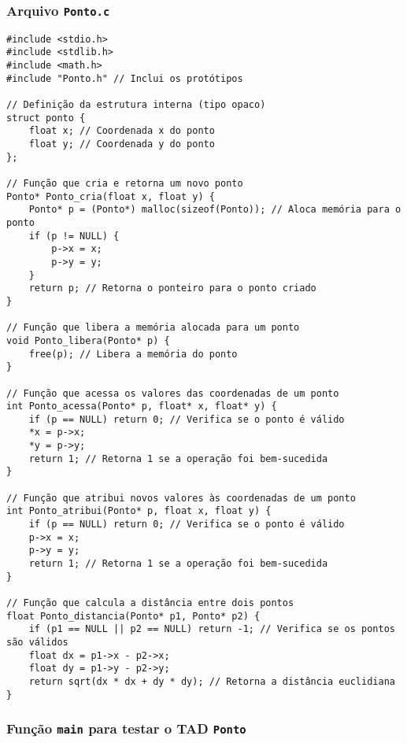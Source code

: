 \subsubsection{Arquivo \texttt{Ponto.c}}

\begin{verbatim}
#include <stdio.h>
#include <stdlib.h>
#include <math.h>
#include "Ponto.h" // Inclui os protótipos

// Definição da estrutura interna (tipo opaco)
struct ponto {
    float x; // Coordenada x do ponto
    float y; // Coordenada y do ponto
};

// Função que cria e retorna um novo ponto
Ponto* Ponto_cria(float x, float y) {
    Ponto* p = (Ponto*) malloc(sizeof(Ponto)); // Aloca memória para o ponto
    if (p != NULL) {
        p->x = x;
        p->y = y;
    }
    return p; // Retorna o ponteiro para o ponto criado
}

// Função que libera a memória alocada para um ponto
void Ponto_libera(Ponto* p) {
    free(p); // Libera a memória do ponto
}

// Função que acessa os valores das coordenadas de um ponto
int Ponto_acessa(Ponto* p, float* x, float* y) {
    if (p == NULL) return 0; // Verifica se o ponto é válido
    *x = p->x;
    *y = p->y;
    return 1; // Retorna 1 se a operação foi bem-sucedida
}

// Função que atribui novos valores às coordenadas de um ponto
int Ponto_atribui(Ponto* p, float x, float y) {
    if (p == NULL) return 0; // Verifica se o ponto é válido
    p->x = x;
    p->y = y;
    return 1; // Retorna 1 se a operação foi bem-sucedida
}

// Função que calcula a distância entre dois pontos
float Ponto_distancia(Ponto* p1, Ponto* p2) {
    if (p1 == NULL || p2 == NULL) return -1; // Verifica se os pontos são válidos
    float dx = p1->x - p2->x;
    float dy = p1->y - p2->y;
    return sqrt(dx * dx + dy * dy); // Retorna a distância euclidiana
}
\end{verbatim}

\subsubsection{Função \texttt{main} para testar o TAD \texttt{Ponto}}

